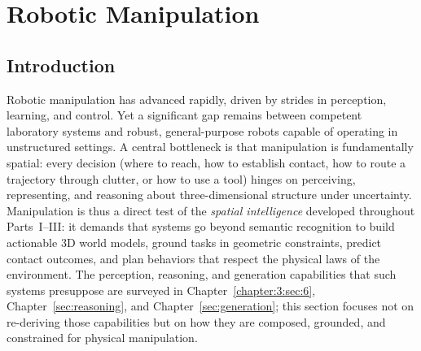 
\section{Robotic Manipulation}
\label{sec:p4_s9_1}



\subsection{Introduction}
\label{subsec:p4-sec9-1-introduction}

Robotic manipulation has advanced rapidly, driven by strides in perception, learning, and control.
Yet a significant gap remains between competent laboratory systems and robust, general-purpose robots capable of operating in unstructured settings.
A central bottleneck is that manipulation is fundamentally spatial: every decision (where to reach, how to establish contact, how to route a trajectory through clutter, or how to use a tool) hinges on perceiving, representing, and reasoning about three-dimensional structure under uncertainty.
Manipulation is thus a direct test of the \emph{spatial intelligence} developed throughout Parts~I--III: it demands that systems go beyond semantic recognition to build actionable 3D world models, ground tasks in geometric constraints, predict contact outcomes, and plan behaviors that respect the physical laws of the environment.
The perception, reasoning, and generation capabilities that such systems presuppose are surveyed in Chapter~\ref{chapter:3:sec:6}, Chapter~\ref{sec:reasoning}, and Chapter~\ref{sec:generation}; this section focuses not on re-deriving those capabilities but on how they are composed, grounded, and constrained for physical manipulation.

